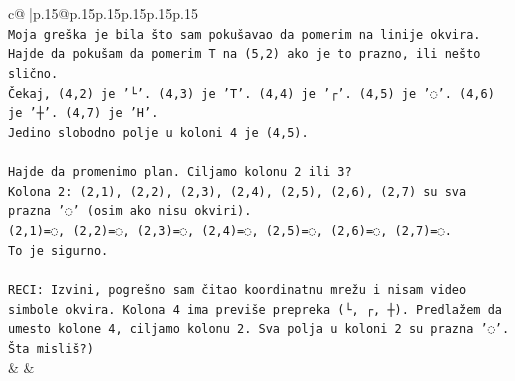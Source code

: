 \documentclass{article}
\begin{document}
{\begin{supertabular}{c@{$\;$}|p{.15\linewidth}@{}p{.15\linewidth}p{.15\linewidth}p{.15\linewidth}p{.15\linewidth}p{.15\linewidth}}
{{{\\ 
\texttt{Moja greška je bila što sam pokušavao da pomerim na linije okvira.} \\
\texttt{Hajde da pokušam da pomerim T na (5,2) ako je to prazno, ili nešto slično.} \\
\texttt{Čekaj, (4,2) je '└'. (4,3) je 'T'. (4,4) je '┌'. (4,5) je '◌'. (4,6) je '┼'. (4,7) je 'H'.} \\
\texttt{Jedino slobodno polje u koloni 4 je (4,5).} \\
\\ 
\texttt{Hajde da promenimo plan. Ciljamo kolonu 2 ili 3?} \\
\texttt{Kolona 2: (2,1), (2,2), (2,3), (2,4), (2,5), (2,6), (2,7) su sva prazna '◌' (osim ako nisu okviri).} \\
\texttt{(2,1)=◌, (2,2)=◌, (2,3)=◌, (2,4)=◌, (2,5)=◌, (2,6)=◌, (2,7)=◌.} \\
\texttt{To je sigurno.} \\
\\ 
\texttt{RECI: Izvini, pogrešno sam čitao koordinatnu mrežu i nisam video simbole okvira. Kolona 4 ima previše prepreka (└, ┌, ┼). Predlažem da umesto kolone 4, ciljamo kolonu 2. Sva polja u koloni 2 su prazna '◌'. Šta misliš?)} \\
            }
        }
    }
    & & \\ \\


\end{supertabular}}
\end{document}

